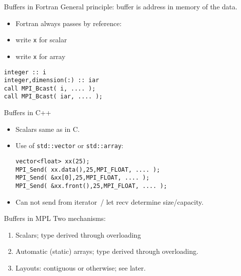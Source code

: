 \begin{fortran}
  \addtocounter{slidecount}{-1}
\begin{numberedframe}{Buffers in Fortran}
  General principle: buffer is address in memory of the data.
  \begin{itemize}
  \item Fortran always passes by reference:
  \item write \lstinline{x} for scalar
  \item write \lstinline{x} for array
  \end{itemize}
\end{numberedframe}
\begin{lstlisting}
integer :: i
integer,dimension(:) :: iar
call MPI_Bcast( i, .... );
call MPI_Bcast( iar, .... );
\end{lstlisting}
\end{fortran}

\begin{cxx}
\begin{numberedframe}{Buffers in C++}
 \lstset{language=C++}
  \begin{itemize}
  \item Scalars same as in C.
  \item Use of \lstinline+std::vector+ or \lstinline+std::array+:
\begin{lstlisting}
vector<float> xx(25);
MPI_Send( xx.data(),25,MPI_FLOAT, .... );
MPI_Send( &xx[0],25,MPI_FLOAT, .... );
MPI_Send( &xx.front(),25,MPI_FLOAT, .... );
\end{lstlisting}
\item Can not send from iterator~/
  let recv determine size/capacity.
  \end{itemize}
 \lstset{language=C}
\end{numberedframe}
\end{cxx}

\begin{mpl}
  \addtocounter{slidecount}{-1}
\begin{numberedframe}{Buffers in MPL}
  Two mechanisms:
  \begin{enumerate}
  \item Scalars; type derived through overloading
  \item Automatic (static) arrays; type derived through overloading.
  \item Layouts: contiguous or otherwise; see later.
  \end{enumerate}  
\end{numberedframe}
\end{mpl}

